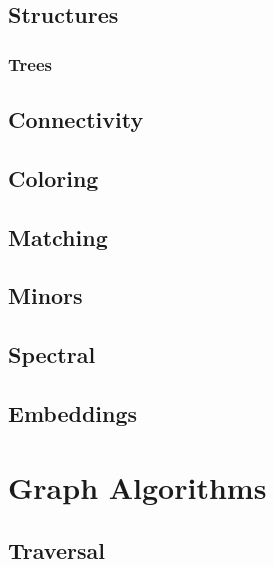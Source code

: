 \section{Structures}


\subsection{Trees}


\section{Connectivity}


\section{Coloring}


\section{Matching}


\section{Minors}


\section{Spectral}


\section{Embeddings}


\chapter{Graph Algorithms}

\section{Traversal}


